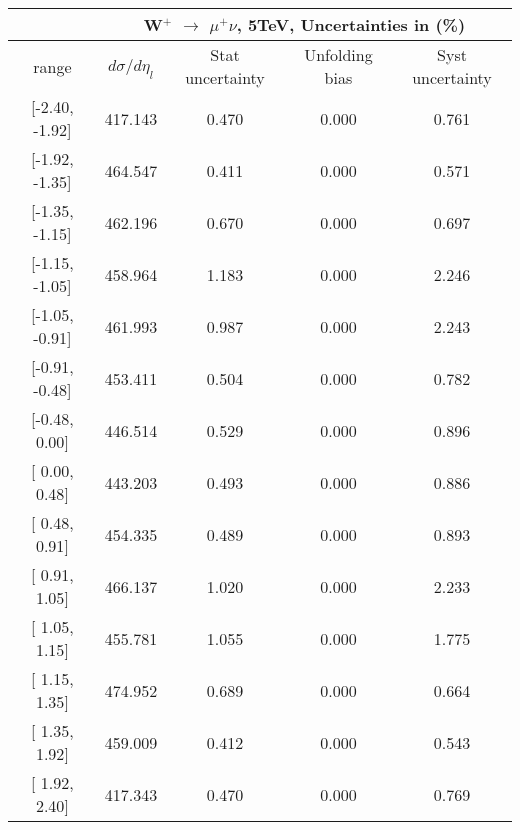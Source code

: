 \documentclass[12pt]{article}
\begin{document}
 
\begin{table}[] 
\begin{tabular}{c|c|c|c|c|}
\cline{2-5}
& \multicolumn{4}{c|}{W$^{+}$ $\rightarrow$ $\mu^{+} \nu $, 5TeV, Uncertainties in (\%)}  \\ \hline \hline 
\multicolumn{1}{|c|}{  range } & $d\sigma$/$d\eta_{l}$   & Stat uncertainty     & Unfolding bias     & Syst uncertainty        \\ \hline \hline 
\multicolumn{1}{|c|}{{[}-2.40,  -1.92{]}}  & 417.143 & 0.470 & 0.000 & 0.761 \\ \hline 
\multicolumn{1}{|c|}{{[}-1.92,  -1.35{]}}  & 464.547 & 0.411 & 0.000 & 0.571 \\ \hline 
\multicolumn{1}{|c|}{{[}-1.35,  -1.15{]}}  & 462.196 & 0.670 & 0.000 & 0.697 \\ \hline 
\multicolumn{1}{|c|}{{[}-1.15,  -1.05{]}}  & 458.964 & 1.183 & 0.000 & 2.246 \\ \hline 
\multicolumn{1}{|c|}{{[}-1.05,  -0.91{]}}  & 461.993 & 0.987 & 0.000 & 2.243 \\ \hline 
\multicolumn{1}{|c|}{{[}-0.91,  -0.48{]}}  & 453.411 & 0.504 & 0.000 & 0.782 \\ \hline 
\multicolumn{1}{|c|}{{[}-0.48,   0.00{]}}  & 446.514 & 0.529 & 0.000 & 0.896 \\ \hline 
\multicolumn{1}{|c|}{{[} 0.00,   0.48{]}}  & 443.203 & 0.493 & 0.000 & 0.886 \\ \hline 
\multicolumn{1}{|c|}{{[} 0.48,   0.91{]}}  & 454.335 & 0.489 & 0.000 & 0.893 \\ \hline 
\multicolumn{1}{|c|}{{[} 0.91,   1.05{]}}  & 466.137 & 1.020 & 0.000 & 2.233 \\ \hline 
\multicolumn{1}{|c|}{{[} 1.05,   1.15{]}}  & 455.781 & 1.055 & 0.000 & 1.775 \\ \hline 
\multicolumn{1}{|c|}{{[} 1.15,   1.35{]}}  & 474.952 & 0.689 & 0.000 & 0.664 \\ \hline 
\multicolumn{1}{|c|}{{[} 1.35,   1.92{]}}  & 459.009 & 0.412 & 0.000 & 0.543 \\ \hline 
\multicolumn{1}{|c|}{{[} 1.92,   2.40{]}}  & 417.343 & 0.470 & 0.000 & 0.769 \\ \hline 
\end{tabular}
\end{table}
\end{document}
